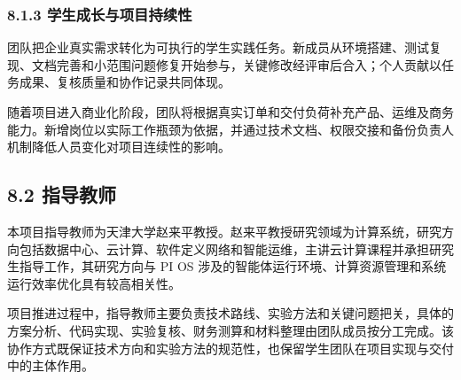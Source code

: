 \subsubsection{8.1.3 学生成长与项目持续性}\label{ux5b66ux751fux6210ux957fux4e0eux9879ux76eeux6301ux7eedux6027}

团队把企业真实需求转化为可执行的学生实践任务。新成员从环境搭建、测试复现、文档完善和小范围问题修复开始参与，关键修改经评审后合入；个人贡献以任务成果、复核质量和协作记录共同体现。

随着项目进入商业化阶段，团队将根据真实订单和交付负荷补充产品、运维及商务能力。新增岗位以实际工作瓶颈为依据，并通过技术文档、权限交接和备份负责人机制降低人员变化对项目连续性的影响。

\subsection{8.2 指导教师}\label{ux6307ux5bfcux6559ux5e08}

本项目指导教师为天津大学赵来平教授。赵来平教授研究领域为计算系统，研究方向包括数据中心、云计算、软件定义网络和智能运维，主讲云计算课程并承担研究生指导工作，其研究方向与 PI OS 涉及的智能体运行环境、计算资源管理和系统运行效率优化具有较高相关性。

项目推进过程中，指导教师主要负责技术路线、实验方法和关键问题把关，具体的方案分析、代码实现、实验复核、财务测算和材料整理由团队成员按分工完成。该协作方式既保证技术方向和实验方法的规范性，也保留学生团队在项目实现与交付中的主体作用。

